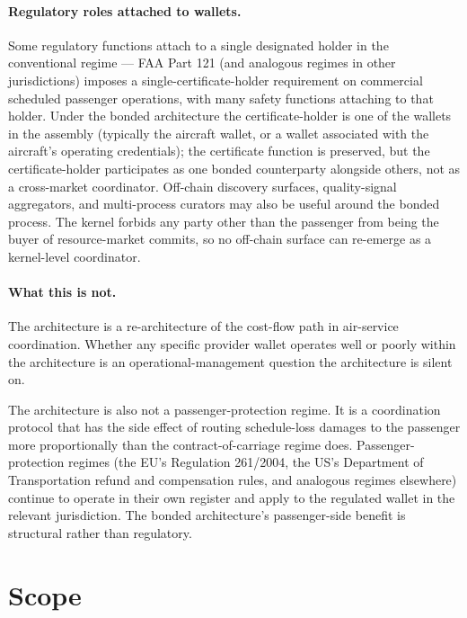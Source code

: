 \documentclass[11pt,a4paper]{article}
\theoremstyle{definition}
\theoremstyle{remark}
\begin{document}
\paragraph{Regulatory roles attached to wallets.}
Some regulatory functions attach to a single designated holder
in the conventional regime --- FAA Part 121 (and analogous regimes
in other jurisdictions) imposes a single-certificate-holder
requirement on commercial scheduled passenger operations, with
many safety functions attaching to that holder. Under the bonded
architecture the certificate-holder is one of the wallets in the
assembly (typically the aircraft wallet, or a wallet associated
with the aircraft's operating credentials); the certificate
function is preserved, but the certificate-holder participates as
one bonded counterparty alongside others, not as a cross-market
coordinator. Off-chain discovery surfaces, quality-signal
aggregators, and multi-process curators may also be useful around
the bonded process. The kernel forbids any party other than the
passenger from being the buyer of resource-market commits, so no
off-chain surface can re-emerge as a kernel-level coordinator.

\paragraph{What this is not.}
The architecture is a re-architecture of the cost-flow path in
air-service coordination. Whether any specific provider wallet
operates well or poorly within the architecture is an
operational-management question the architecture is silent on.

The architecture is also not a passenger-protection regime. It is
a coordination protocol that has the side effect of routing
schedule-loss damages to the passenger more proportionally than
the contract-of-carriage regime does. Passenger-protection
regimes (the EU's Regulation 261/2004, the US's Department of
Transportation refund and compensation rules, and analogous
regimes elsewhere) continue to operate in their own register and
apply to the regulated wallet in the relevant jurisdiction. The
bonded architecture's passenger-side benefit is structural rather
than regulatory.

\section{Scope}
\label{sec:scope}
\end{document}
